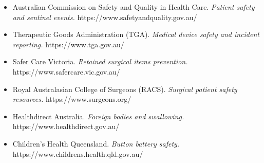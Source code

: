 \begin{itemize}
    \item Australian Commission on Safety and Quality in Health Care. \textit{Patient safety and sentinel events.} https://www.safetyandquality.gov.au/
    \item Therapeutic Goods Administration (TGA). \textit{Medical device safety and incident reporting.} https://www.tga.gov.au/
    \item Safer Care Victoria. \textit{Retained surgical items prevention.} https://www.safercare.vic.gov.au/
    \item Royal Australasian College of Surgeons (RACS). \textit{Surgical patient safety resources.} https://www.surgeons.org/
    \item Healthdirect Australia. \textit{Foreign bodies and swallowing.} https://www.healthdirect.gov.au/
    \item Children's Health Queensland. \textit{Button battery safety.} https://www.childrens.health.qld.gov.au/
\end{itemize}

\clearpage
